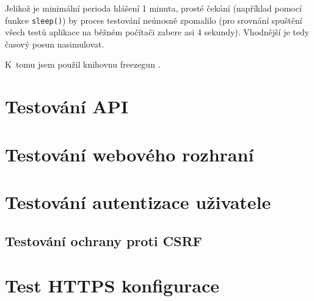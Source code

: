 Jelikož je minimální perioda hlášení 1 minuta, prosté čekání (například pomocí funkce \texttt{sleep()}) by proces testování neúnosně zpomalilo (pro srovnání spuštění všech testů aplikace na běžném počítači zabere asi 4 sekundy). Vhodnější je tedy časový posun nasimulovat.

K~tomu jsem použil knihovnu freezegun \cite{freezegun}.

\section{Testování API}

\section{Testování webového rozhraní}

\section{Testování autentizace uživatele}

\subsection{Testování ochrany proti CSRF}


\section{Test HTTPS konfigurace}



